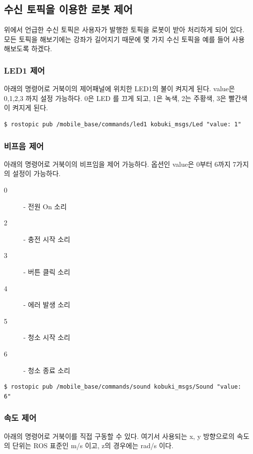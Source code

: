 \subsection{수신 토픽을 이용한 로봇 제어}

위에서 언급한 수신 토픽은 사용자가 발행한 토픽을 로봇이 받아 처리하게 되어 있다. 모든 토픽을 해보기에는 강좌가 길어지기 때문에 몇 가지 수신 토픽을 예를 들어 사용해보도록 하겠다.

\subsubsection{LED1 제어}
아래의 명령어로 거북이의 제어패널에 위치한 LED1의 불이 켜지게 된다. value은 0,1,2,3 까지 설정 가능하다. 0은 LED 를 끄게 되고, 1은 녹색, 2는 주황색, 3은 빨간색이 켜지게 된다.

\begin{lstlisting}[language=ROS]
$ rostopic pub /mobile_base/commands/led1 kobuki_msgs/Led "value: 1"
\end{lstlisting}


\subsubsection{비프음 제어}
아래의 명령어로 거북이의 비프임을 제어 가능하다. 옵션인 value은 0부터 6까지 7가지의 설정이 가능하다. 

\begin{description}
\item[0] - 전원 On 소리
\item[2] - 충전 시작  소리
\item[3] - 버튼 클릭 소리
\item[4] - 에러 발생 소리
\item[5] - 청소 시작 소리
\item[6] - 청소 종료 소리
\end{description}

\begin{lstlisting}[language=ROS]
$ rostopic pub /mobile_base/commands/sound kobuki_msgs/Sound "value: 6"
\end{lstlisting}


\subsubsection{속도 제어}

아래의 명령어로 거북이를 직접 구동할 수 있다. 여기서 사용되는 x, y 방향으로의 속도의 단위는 ROS 표준인 m/s 이고, z의 경우에는 rad/s 이다. 

